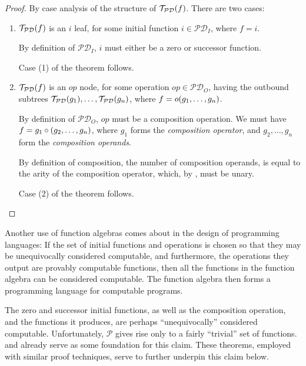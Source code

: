 \begin{proof} By case analysis of the structure of
$\mathcal{T}_\mathcal{PD}{\mathopen{}\left({f}\right)\mathclose{}}$.  There are two
cases:\begin{enumerate}[label=(\arabic*)]

\item $\mathcal{T}_\mathcal{PD}{\mathopen{}\left({f}\right)\mathclose{}}$ is an $i$ leaf, for some initial function
$i \in \mathcal{PD}_I$, where $f = i$.

By definition of $\mathcal{PD}_I$, $i$ must either be a zero or successor
function.

Case (1) of the theorem follows.

\item $\mathcal{T}_\mathcal{PD}{\mathopen{}\left({f}\right)\mathclose{}}$ is an $op$ node, for some operation $op
\in \mathcal{PD}_O$, having the outbound subtrees
$\mathcal{T}_\mathcal{PD}{\mathopen{}\left({g_1}\right)\mathclose{}}, \ldots, \mathcal{T}_\mathcal{PD}{\mathopen{}\left({g_n}\right)\mathclose{}}$,
where $f = o{\mathopen{}\left({g_1, \ldots, g_n}\right)\mathclose{}}$.

By definition of $\mathcal{PD}_O$, $op$ must be a composition operation. We
must have $f = g_1 \circ {\ensuremath{\mathopen{}\left({g_2, \ldots, g_n}\right)\mathclose{}}}$, where $g_1$ forms the
\emph{composition operator}, and $g_2, \ldots, g_n$ form the \emph{composition
operands}.

By definition of composition, the number of composition operands, is equal to
the arity of the composition operator, which, by ,
must be unary.

Case (2) of the theorem follows.\end{enumerate}\end{proof}

Another use of function algebras comes about in the design of programming
languages: If the set of initial functions and operations is chosen so that
they may be unequivocally considered computable, and furthermore, the
operations they output are provably computable functions, then all the
functions in the function algebra can be considered computable. The function
algebra then forms a programming language for computable programs.

The zero and successor initial functions, as well as the composition operation,
and the functions it produces, are perhaps ``unequivocally'' considered
computable. Unfortunately, $\mathcal{P}$ gives rise only to a fairly
``trivial'' set of functions.   and
 already serve as some foundation for this claim.
These theorems, employed with similar proof techniques, serve to further
underpin this claim below.

